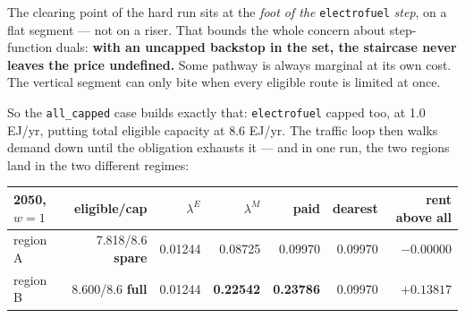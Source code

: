 \documentclass[11pt,a4paper]{article}
\newcommand{\var}[1]{\texttt{\small #1}}
\begin{document}
The clearing point of the hard run sits at the \emph{foot of the}
\var{electrofuel} \emph{step}, on a flat segment --- not on a riser. That bounds the whole
concern about step-function duals: \textbf{with an uncapped backstop in the set, the
staircase never leaves the price undefined.} Some pathway is always marginal at its own
cost. The vertical segment can only bite when every eligible route is limited at once.

So the \var{all\_capped} case builds exactly that: \var{electrofuel} capped too, at
1.0 EJ/yr, putting total eligible capacity at 8.6 EJ/yr. The traffic loop then walks
demand down until the obligation exhausts it --- and in one run, the two regions land in
the two different regimes:

\begin{table}[h]
\centering\small
\begin{tabular}{@{}lrrrrrr@{}}
\toprule
\textbf{2050, $w=1$} & \textbf{eligible/cap} & $\lambda^{E}$ & $\lambda^{M}$ &
  \textbf{paid} & \textbf{dearest} & \textbf{rent above all} \\
\midrule
region A & 7.818/8.6 \textbf{spare} & 0.01244 & 0.08725 & 0.09970 & 0.09970 & $-0.00000$ \\
region B & 8.600/8.6 \textbf{full} & 0.01244 & \textbf{0.22542} &
  \textbf{0.23786} & 0.09970 & $\mathbf{+0.13817}$ \\
\bottomrule
\end{tabular}
\end{table}
\end{document}
